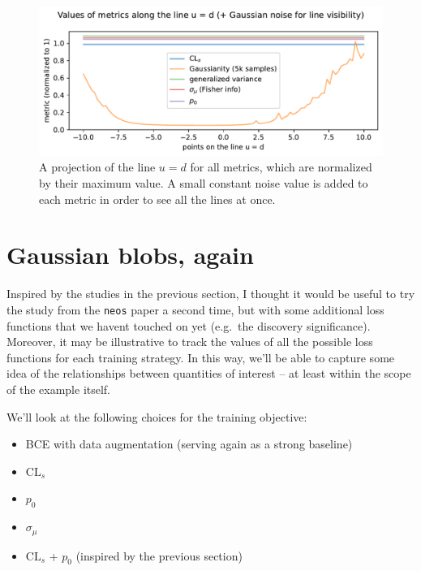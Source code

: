 \documentclass[
  11pt,
  numbers=noendperiod]{book}
\providecommand{\tightlist}{%
  \setlength{\itemsep}{0pt}\setlength{\parskip}{0pt}}\usepackage{longtable,booktabs,array}
\begin{document}
\begin{figure}

{\centering \includegraphics{./images/equal-g.pdf}

}

\caption{\label{fig-ud}A projection of the line \(u = d\) for all
metrics, which are normalized by their maximum value. A small constant
noise value is added to each metric in order to see all the lines at
once.}

\end{figure}

\hypertarget{gaussian-blobs-again}{%
\section{Gaussian blobs, again}\label{gaussian-blobs-again}}

Inspired by the studies in the previous section, I thought it would be
useful to try the study from the \texttt{neos} paper a second time, but
with some additional loss functions that we havent touched on yet
(e.g.~the discovery significance). Moreover, it may be illustrative to
track the values of all the possible loss functions for each training
strategy. In this way, we'll be able to capture some idea of the
relationships between quantities of interest -- at least within the
scope of the example itself.

We'll look at the following choices for the training objective:

\begin{itemize}
\tightlist
\item
  BCE with data augmentation (serving again as a strong baseline)
\item
  \(\mathrm{CL}_s\)
\item
  \(p_0\)
\item
  \(\sigma_{\mu}\)
\item
  \(\mathrm{CL}_s\) + \(p_0\) (inspired by the previous section)
\end{itemize}
\end{document}
